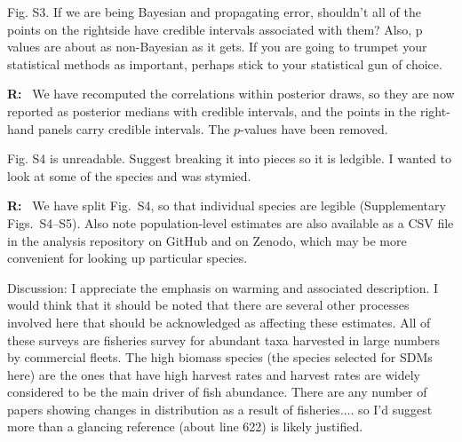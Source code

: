 \documentclass[11pt]{article}
\newcommand{\reviewer}[1]{\par\medskip\noindent\textcolor{revcolor}{#1}\par}
\newenvironment{reply}
{\par\smallskip\begingroup\color{replycolor}\noindent\textbf{R:}\ }
{\endgroup\par\medskip}
\begin{document}
\reviewer{Fig. S3. If we are being Bayesian and propagating error, shouldn't all of the points on the rightside have credible intervals associated with them? Also, p values are about as non-Bayesian as it gets. If you are going to trumpet your statistical methods as important, perhaps stick to your statistical gun of choice.}

\begin{reply}
We have recomputed the correlations within posterior draws, so they are now reported as posterior medians with credible intervals, and the points in the right-hand panels carry credible intervals. The $p$-values have been removed.
\end{reply}

    

\reviewer{Fig. S4 is unreadable. Suggest breaking it into pieces so it is ledgible. I wanted to look at some of the species and was stymied.}

\begin{reply}
We have split Fig.~S4, so that individual species are legible (Supplementary Figs.~S4--S5). Also note population-level estimates are also available as a CSV file in the analysis repository on GitHub and on Zenodo, which may be more convenient for looking up particular species.
\end{reply}

\reviewer{Discussion: I appreciate the emphasis on warming and associated description. I would think that it should be noted that there are several other processes involved here that should be acknowledged as affecting these estimates. All of these surveys are fisheries survey for abundant taxa harvested in large numbers by commercial fleets. The high biomass species (the species selected for SDMs here) are the ones that have high harvest rates and harvest rates are widely considered to be the main driver of fish abundance. There are any number of papers showing changes in distribution as a result of fisheries.... so I'd suggest more than a glancing reference (about line 622) is likely justified.}
\end{document}

